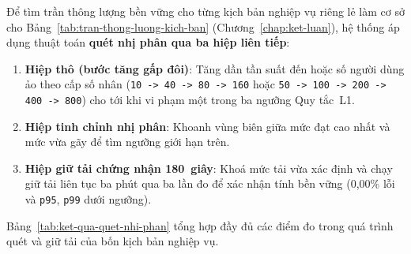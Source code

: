 Để tìm trần thông lượng bền vững cho từng kịch bản nghiệp vụ riêng lẻ làm cơ sở cho Bảng~\ref{tab:tran-thong-luong-kich-ban} (Chương~\ref{chap:ket-luan}), hệ thống áp dụng thuật toán \textbf{quét nhị phân qua ba hiệp liên tiếp}:

\begin{enumerate}
\item \textbf{Hiệp thô (bước tăng gấp đôi)}: Tăng dần tần suất đến hoặc số người dùng ảo theo cấp số nhân (\texttt{10 -> 40 -> 80 -> 160} hoặc \texttt{50 -> 100 -> 200 -> 400 -> 800}) cho tới khi vi phạm một trong ba ngưỡng Quy tắc~L1.
\item \textbf{Hiệp tinh chỉnh nhị phân}: Khoanh vùng biên giữa mức đạt cao nhất và mức vừa gãy để tìm ngưỡng giới hạn trên.
\item \textbf{Hiệp giữ tải chứng nhận 180~giây}: Khoá mức tải vừa xác định và chạy giữ tải liên tục ba phút qua ba lần đo để xác nhận tính bền vững (0,00\% lỗi và \texttt{p95}, \texttt{p99} dưới ngưỡng).
\end{enumerate}

Bảng~\ref{tab:ket-qua-quet-nhi-phan} tổng hợp đầy đủ các điểm đo trong quá trình quét và giữ tải của bốn kịch bản nghiệp vụ.

